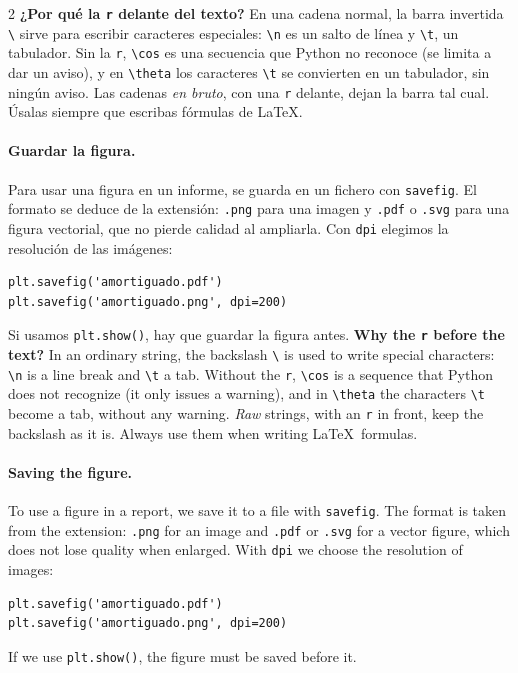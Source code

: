 \begin{paracol}{2}
\textbf{¿Por qué la \texttt{r} delante del texto?} En una cadena normal, la barra invertida \texttt{\textbackslash} sirve para escribir caracteres especiales: \texttt{\textbackslash n} es un salto de línea y \texttt{\textbackslash t}, un tabulador. Sin la \texttt{r}, \texttt{\textquotesingle{}\textbackslash cos\textquotesingle{}} es una secuencia que Python no reconoce (se limita a dar un aviso), y en \texttt{\textquotesingle{}\textbackslash theta\textquotesingle{}} los caracteres \texttt{\textbackslash t} se convierten en un tabulador, sin ningún aviso. Las cadenas \emph{en bruto}, con una \texttt{r} delante, dejan la barra tal cual. Úsalas siempre que escribas fórmulas de \LaTeX.

\paragraph{Guardar la figura.} Para usar una figura en un informe, se guarda en un fichero con \texttt{savefig}. El formato se deduce de la extensión: \texttt{.png} para una imagen y \texttt{.pdf} o \texttt{.svg} para una figura vectorial, que no pierde calidad al ampliarla. Con \texttt{dpi} elegimos la resolución de las imágenes:
\begin{verbatim}
plt.savefig('amortiguado.pdf')
plt.savefig('amortiguado.png', dpi=200)
\end{verbatim}
Si usamos \texttt{plt.show()}, hay que guardar la figura antes.
\switchcolumn
\textbf{Why the \texttt{r} before the text?} In an ordinary string, the backslash \texttt{\textbackslash} is used to write special characters: \texttt{\textbackslash n} is a line break and \texttt{\textbackslash t} a tab. Without the \texttt{r}, \texttt{\textquotesingle{}\textbackslash cos\textquotesingle{}} is a sequence that Python does not recognize (it only issues a warning), and in \texttt{\textquotesingle{}\textbackslash theta\textquotesingle{}} the characters \texttt{\textbackslash t} become a tab, without any warning. \emph{Raw} strings, with an \texttt{r} in front, keep the backslash as it is. Always use them when writing \LaTeX\ formulas.

\paragraph{Saving the figure.} To use a figure in a report, we save it to a file with \texttt{savefig}. The format is taken from the extension: \texttt{.png} for an image and \texttt{.pdf} or \texttt{.svg} for a vector figure, which does not lose quality when enlarged. With \texttt{dpi} we choose the resolution of images:
\begin{verbatim}
plt.savefig('amortiguado.pdf')
plt.savefig('amortiguado.png', dpi=200)
\end{verbatim}
If we use \texttt{plt.show()}, the figure must be saved before it.
\end{paracol}

